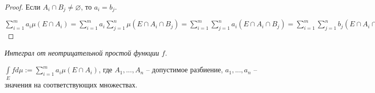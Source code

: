 \begin{proof}
    Если $A_i\cap B_j\not=\varnothing$, то $a_i=b_j$.

    $\sum\limits_{i=1}^m a_i \mu (E\cap A_i)=\sum\limits_{i=1}^m a_i \sum\limits_{j=1}^n \mu (E\cap A_i\cap B_j)=
    \sum\limits_{i=1}^m \sum\limits_{j=1}^n a_i (E\cap A_i\cap B_j)=\sum\limits_{i=1}^m \sum\limits_{j=1}^n b_j (E\cap A_i\cap B_j)=
    \sum\limits_{j=1}^n b_j \mu (E\cap B_j)$
\end{proof}

\begin{definition}
    \textit{Интеграл от неотрицательной простой функции $f$}.
    
    $\int\limits_E f d\mu := 
    \sum\limits_{i=1}^m a_i \mu (E\cap A_i)$, где $A_1, ..., A_n$ – допустимое разбиение,
    $a_1, ..., a_n$ – значения на соответствующих множествах.
\end{definition}